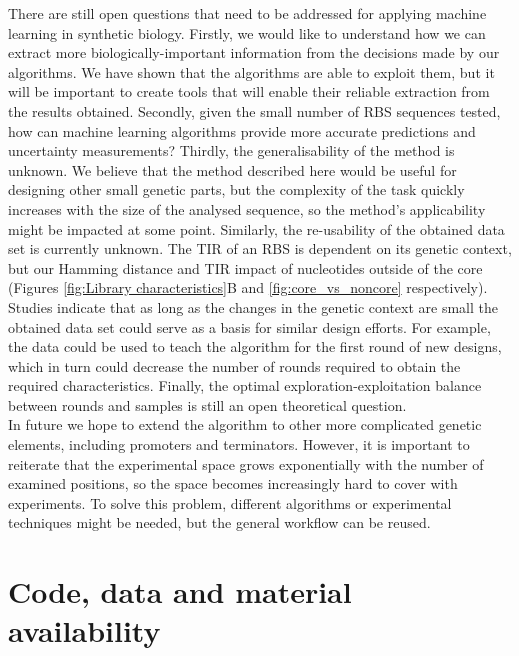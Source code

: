 \documentclass{article}
\begin{document}
There are still open questions that need to be addressed for applying machine learning in synthetic biology.
Firstly, we would like to understand how we can extract more biologically-important information from the decisions made by our algorithms.
We have shown that the algorithms are able to exploit them, but it will be important to create tools that will enable their reliable extraction from the results obtained.
Secondly, given the small number of RBS sequences tested, how can machine learning algorithms provide more accurate predictions and uncertainty measurements?
Thirdly, the generalisability of the method is unknown.
We believe that the method described here would be useful for designing other small genetic parts, but the complexity of the task quickly increases with the size of the analysed sequence, so the method's applicability might be impacted at some point.
Similarly, the re-usability of the obtained data set is currently unknown.
The TIR of an RBS is dependent on its genetic context, but our Hamming distance and TIR impact of nucleotides outside of the core (Figures \ref{fig:Library characteristics}B and \ref{fig:core_vs_noncore} respectively).
Studies indicate that as long as the changes in the genetic context are small the obtained data set could serve as a basis for similar design efforts.
For example, the data could be used to teach the algorithm for the first round of new designs, which in turn could decrease the number of rounds required to obtain the required characteristics.
Finally, the optimal exploration-exploitation balance between rounds and samples is still an open theoretical question.
\\

In future we hope to extend the algorithm to other more complicated genetic elements, including promoters and terminators.
However, it is important to reiterate that the experimental space grows exponentially with the number of examined positions, so the space becomes increasingly hard to cover with experiments.
To solve this problem, different algorithms or experimental techniques might be needed, but the general workflow can be reused.\\




\section*{Code, data and material availability}
\end{document}
